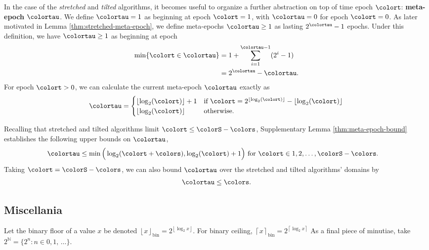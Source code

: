 In the case of the \textit{stretched} and \textit{tilted} algorithms, it becomes useful to organize a further abstraction on top of time epoch $\colort$: \textbf{meta-epoch} $\colortau$.
We define $\colortau=1$ as beginning at epoch $\colort = 1$, with $\colortau=0$ for epoch $\colort=0$.
As later motivated in Lemma \ref{thm:stretched-meta-epoch}, we define meta-epochs $\colortau\geq1$ as lasting $2^{\colortau} - 1$ epochs.
Under this definition, we have $\colortau\geq1$ as beginning at epoch
\begin{align*}
\min\{\colort \in \colortau\}
&= 1 + \sum_{i=1}^{\colortau - 1} (2^{i} - 1) \\
&= 2^{\colortau} - \colortau.
\end{align*}
For epoch $\colort > 0$, we can calculate the current meta-epoch $\colortau$ exactly as
\begin{align*}
\colortau
=
\begin{cases}
\left\lfloor \log_2(\colort) \right\rfloor + 1 & \text{if } \colort = 2^{\left\lfloor \log_2(\colort) \right\rfloor} - \left\lfloor \log_2(\colort) \right\rfloor \\
\left\lfloor \log_2(\colort) \right\rfloor & \text{otherwise.}
\end{cases}
\end{align*}

Recalling that stretched and tilted algorithms limit $\colort \leq \colorS - \colors$, Supplementary Lemma \ref{thm:meta-epoch-bound} establishes the following upper bounds on $\colortau$,
\begin{align*}
\colortau
&\leq
\min\Big(
  \log_2(\colort + \colors),
  \log_2(\colort) + 1
\Big)
\text{ for } \colort \in 1, 2, \ldots, \colorS - \colors.
\end{align*}
Taking $\colort = \colorS - \colors$, we can also bound $\colortau$ over the stretched and tilted algorithms' domains by
\begin{align*}
\colortau \leq \colors.
\end{align*}

\subsection{Miscellania}

Let the binary floor of a value $x$ be denoted $\left\lfloor x \right\rfloor_\mathrm{bin} = 2^{\left\lfloor \log_2 x \right\rfloor}$.
For binary ceiling, $\left\lceil x \right\rceil_\mathrm{bin} = 2^{\left\lceil \log_2 x \right\rceil}$
As a final piece of minutiae, take $2^{\mathbb{N}} = \{2^n : n \in 0, 1, \,\ldots \}$.
